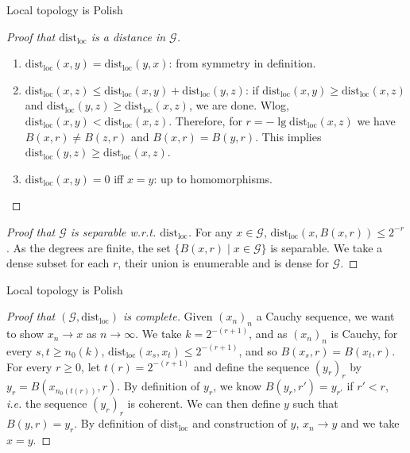 \documentclass{beamer}
\newcommand{\dloc}{\mathrm{dist}_\mathrm{loc}}
\newcommand{\Gcal}{\mathcal{G}}
\begin{document}
\begin{frame}{Local topology is Polish}
  \begin{proof}[Proof that $\dloc$ is a distance in $\Gcal$]
    \begin{enumerate}
      \item $\dloc(x, y) = \dloc(y, x)$: from symmetry in definition.
            \pause
      \item $\dloc(x, z) \le \dloc(x, y) + \dloc(y, z)$: if $\dloc(x, y) \ge \dloc(x, z)$
            and $\dloc(y, z) \ge \dloc(x, z)$, we are done.
            \pause
            Wlog, $\dloc(x, y) < \dloc(x, z)$.
            \pause
            Therefore, for $r = - \lg \dloc(x, z)$ we have $B(x, r) \neq B(z, r)$ and
            $B(x, r) = B(y, r)$.
            \pause
            This implies $\dloc(y, z) \ge \dloc(x, z)$.
            \pause
      \item $\dloc(x, y) = 0$ iff $x = y$: up to homomorphisms.
    \end{enumerate}
  \end{proof}

  \pause

  \begin{proof}[Proof that $\Gcal$  is separable w.r.t. $\dloc$]
    For any $x \in \Gcal$, $\dloc(x, B(x, r)) \le 2^{-r}$.
    \pause
    As the degrees are finite, the set $\{B(x, r) \mid x \in \Gcal\}$ is separable.
    \pause
    We take a dense subset for each $r$,
    \pause
    their union is enumerable and is dense for $\Gcal$.
  \end{proof}
\end{frame}

\begin{frame}{Local topology is Polish}
  \begin{proof}[Proof that $(\Gcal, \dloc)$ is complete]
    Given $(x_n)_n$ a Cauchy sequence, we want to show $x_n \to x$ as $n \to \infty$.
    \pause
    We take $k = 2^{-(r + 1)}$, and as $(x_n)_n$ is Cauchy, for every $s, t \ge n_0(k)$,
    $\dloc(x_s, x_t) \le 2^{-(r + 1)}$,
    \pause
    and so $B(x_s, r) = B(x_t, r)$.
    \pause
    For every $r \ge 0$, let $t(r) = 2^{-(r + 1)}$ and define the sequence $(y_r)_r$ by
    $y_r = B(x_{n_0(t(r))}, r)$.
    \pause
    By definition of $y_r$, we know $B(y_r, r') = y_{r'}$ if $r' < r$, \textit{i.e.} the
    sequence $(y_r)_r$ is coherent.
    \pause
    We can then define $y$ such that $B(y, r) = y_r$.
    \pause
    By definition of $\dloc$ and construction of $y$, $x_n \to y$ and we take $x = y$.
  \end{proof}
\end{frame}
\end{document}
